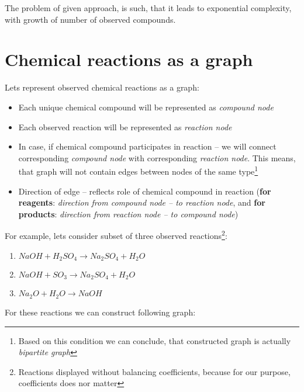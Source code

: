 \documentclass[10pt]{article}
\begin{document}
The problem of given approach, is such, that it leads to exponential complexity, with growth of number of observed compounds.

\newpage

\section{Chemical reactions as a graph}

Lets represent observed chemical reactions as a graph: 
\begin{itemize}
    \setlength \itemsep{0em}
    \item Each unique chemical compound will be represented as \emph{compound node}
    \item Each observed reaction will be represented as \emph{reaction node}
    \item In case, if chemical compound participates in reaction -- we will connect corresponding \emph{compound node} with corresponding \emph{reaction node}. This means, that graph will not contain edges between nodes of the same type\footnote{Based on this condition we can conclude, that constructed graph is actually \emph{bipartite graph}}
    \item Direction of edge -- reflects role of chemical compound in reaction (\textbf{for reagents}: \emph{direction from compound node -- to reaction node}, and \textbf{for products}: \emph{direction from reaction node -- to compound node})
\end{itemize}

\noindent For example, lets consider subset of three observed reactions\footnote{Reactions displayed without balancing coefficients, because for our purpose, coefficients does nor matter}:

\begin{enumerate}
    \setlength \itemsep{0em}
    \item $NaOH + H_{2}SO_{4} \rightarrow Na_{2}SO_{4} + H_{2}O$
    \item $NaOH + SO_{3} \rightarrow Na_{2}SO_{4} + H_{2}O$
    \item $Na_{2}O + H_{2}O \rightarrow NaOH$
\end{enumerate}

\noindent For these reactions we can construct following graph:
\end{document}
